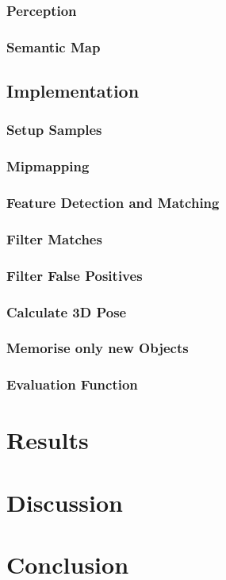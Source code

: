 \documentclass[11pt, twoside, a4paper]{report}
\begin{document}
\subsection{Perception}
\subsection{Semantic Map}

\section{Implementation}
\subsection{Setup Samples}
\subsection{Mipmapping}
\subsection{Feature Detection and Matching}
\subsection{Filter Matches}
\subsection{Filter False Positives}
\subsection{Calculate 3D Pose}
\subsection{Memorise only new Objects}
\subsection{Evaluation Function}


\chapter{Results}


\chapter{Discussion}


\chapter{Conclusion}
\end{document}
